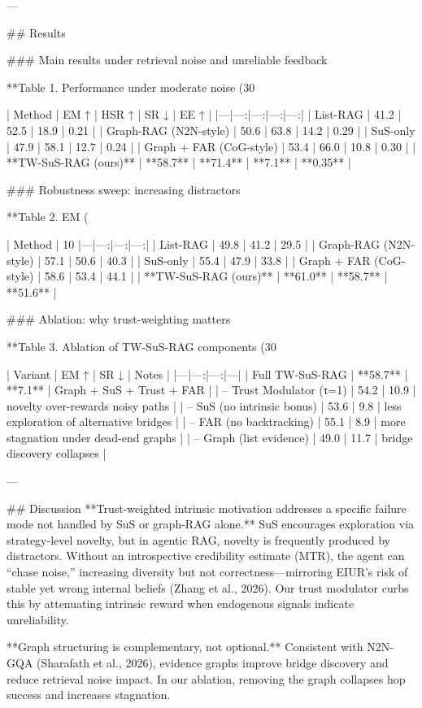 ---

## Results  

### Main results under retrieval noise and unreliable feedback  

**Table 1. Performance under moderate noise (30%

| Method | EM ↑ | HSR ↑ | SR ↓ | EE ↑ |
|---|---:|---:|---:|---:|
| List-RAG | 41.2 | 52.5 | 18.9 | 0.21 |
| Graph-RAG (N2N-style) | 50.6 | 63.8 | 14.2 | 0.29 |
| SuS-only | 47.9 | 58.1 | 12.7 | 0.24 |
| Graph + FAR (CoG-style) | 53.4 | 66.0 | 10.8 | 0.30 |
| **TW-SuS-RAG (ours)** | **58.7** | **71.4** | **7.1** | **0.35** |

### Robustness sweep: increasing distractors  

**Table 2. EM (%

| Method | 10%
|---|---:|---:|---:|
| List-RAG | 49.8 | 41.2 | 29.5 |
| Graph-RAG (N2N-style) | 57.1 | 50.6 | 40.3 |
| SuS-only | 55.4 | 47.9 | 33.8 |
| Graph + FAR (CoG-style) | 58.6 | 53.4 | 44.1 |
| **TW-SuS-RAG (ours)** | **61.0** | **58.7** | **51.6** |

### Ablation: why trust-weighting matters  

**Table 3. Ablation of TW-SuS-RAG components (30%

| Variant | EM ↑ | SR ↓ | Notes |
|---|---:|---:|---|
| Full TW-SuS-RAG | **58.7** | **7.1** | Graph + SuS + Trust + FAR |
| – Trust Modulator (τ=1) | 54.2 | 10.9 | novelty over-rewards noisy paths |
| – SuS (no intrinsic bonus) | 53.6 | 9.8 | less exploration of alternative bridges |
| – FAR (no backtracking) | 55.1 | 8.9 | more stagnation under dead-end graphs |
| – Graph (list evidence) | 49.0 | 11.7 | bridge discovery collapses |

---

## Discussion  
**Trust-weighted intrinsic motivation addresses a specific failure mode not handled by SuS or graph-RAG alone.** SuS encourages exploration via strategy-level novelty, but in agentic RAG, novelty is frequently produced by distractors. Without an introspective credibility estimate (MTR), the agent can “chase noise,” increasing diversity but not correctness—mirroring EIUR’s risk of stable yet wrong internal beliefs (Zhang et al., 2026). Our trust modulator curbs this by attenuating intrinsic reward when endogenous signals indicate unreliability.

**Graph structuring is complementary, not optional.** Consistent with N2N-GQA (Sharafath et al., 2026), evidence graphs improve bridge discovery and reduce retrieval noise impact. In our ablation, removing the graph collapses hop success and increases stagnation.

